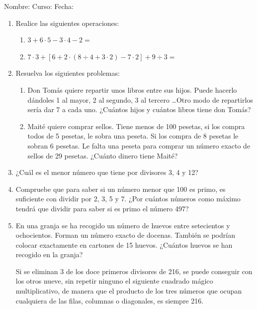 \documentclass[letterpaper,fleqn]{article}
\newcommand{\LineaNombre}{%
\par
\vspace{\baselineskip}
Nombre:\hrulefill \; Curso: \underline{\hspace*{48pt}} \; Fecha: \underline{\hspace*{2.5cm}} \relax
\par}
\begin{document}
\LineaNombre
\begin{enumerate}
 \item Realice las siguientes operaciones:
 \begin{enumerate}
 \item $3+6\cdot 5-3\cdot 4-2=$\noanswer
 \item $7\cdot 3+[6+2\cdot (8\div 4+3\cdot 2)-7\cdot 2]+9\div 3=$\noanswer
 \end{enumerate}
 \item Resuelva los siguientes problemas:
 \begin{enumerate}
 \item Don Tomás quiere repartir unos libros entre sus hijos. Puede hacerlo dándoles 1 al mayor, 2 al segundo, 3 al tercero \ldots Otro modo de repartirlos sería dar 7 a cada uno. ¿Cuántos hijos y cuántos libros tiene don Tomás?\noanswer
 \item Maité quiere comprar sellos. Tiene menos de 100 pesetas, si los compra todos de 5 pesetas, le sobra una peseta. Si los compra de 8 pesetas le sobran 6 pesetas. Le falta una peseta para comprar un n\'{u}mero exacto de sellos de 29 pesetas. ¿Cu\'{a}nto dinero tiene Mait\'{e}?\noanswer
 \end{enumerate}
 \item ¿Cuál es el menor número que tiene por divisores 3, 4 y 12?\noanswer
 \item Compruebe que para saber si un número menor que 100 es primo, es suficiente con dividir por 2, 3, 5 y 7. ¿Por cuántos números como máximo tendrá que dividir para saber si es primo el número 497?\noanswer
 \item En una granja se ha recogido un número de huevos entre setecientos y ochocientos. Forman un número exacto de docenas. También se podrían colocar exactamente en cartones de 15 huevos. ¿Cuántos huevos se han recogido en la granja?\noanswer
\begin{minipage}{.6\textwidth}
 Si se eliminan 3 de los doce primeros divisores de 216, se puede conseguir con los otros nueve, sin repetir ninguno el siguiente cuadrado mágico multiplicativo, de manera que el producto de los tres números que ocupan cualquiera de las filas, columnas o diagonales, es siempre 216.
\end{minipage} \hfill
\begin{minipage}{.35\textwidth}

\end{minipage}
\end{enumerate}
\end{document}
